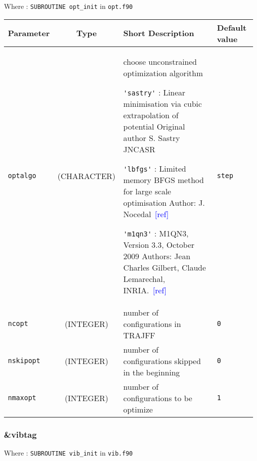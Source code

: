 \documentclass[a4paper]{article}
\newcommand{\addref}{\textcolor{blue}{[ref]}}
\begin{document}
Where : \verb?SUBROUTINE opt_init? in \verb?opt.f90?
\newline

\begin{longtable}{l|c|m{8cm}|m{2cm}}
\hline
\hline
Parameter        &  Type              &          Short Description                                                          & Default value \\
\hline
\hline
\rule[-0.75cm]{0cm}{1.5cm}
\verb?optalgo?   & (CHARACTER)        & \newline choose unconstrained optimization algorithm \newline 

                                        \verb?'sastry'? : Linear minimisation via cubic extrapolation of potential 
					Original author S. Sastry JNCASR \newline

					\verb?'lbfgs'? : Limited memory BFGS method for large scale optimisation
					Author: J. Nocedal~\addref  \newline 
					 
					\verb?'m1qn3'? : M1QN3, Version 3.3, October 2009
					Authors: Jean Charles Gilbert, Claude Lemarechal, INRIA.~\addref \newline            & \verb?step? \tabularnewline
\hline
\rule[-0.75cm]{0cm}{1.5cm}
\verb?ncopt?     & (INTEGER)          & number of configurations in TRAJFF                                                   & \verb?0? \\
\hline
\rule[-0.75cm]{0cm}{1.5cm}
\verb?nskipopt?  & (INTEGER)          & number of configurations skipped in the beginning                                    & \verb?0? \\
\hline
\rule[-0.75cm]{0cm}{1.5cm}
\verb?nmaxopt?   & (INTEGER)          & number of configurations to be optimize                                              & \verb?1? \\
\hline
\hline
\end{longtable}

\subsubsection{\&vibtag}

Where : \verb?SUBROUTINE vib_init? in \verb?vib.f90?
\newline
\end{document}
